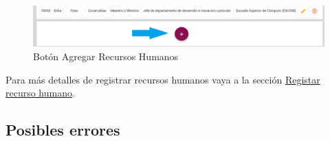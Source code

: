             \begin{figure}[!hbtp]
                \centering
                \hypertarget{add}{\includegraphics[width=0.7\linewidth]{images/SP1/BtnAgregar}}
                \caption{Botón Agregar Recursos Humanos}
                \label{add}
            \end{figure}
    
            Para más detalles de registrar recursos humanos vaya a la sección \hyperlink{registrar}{Registar recurso humano}.
            
        \subsection{Posibles errores}
